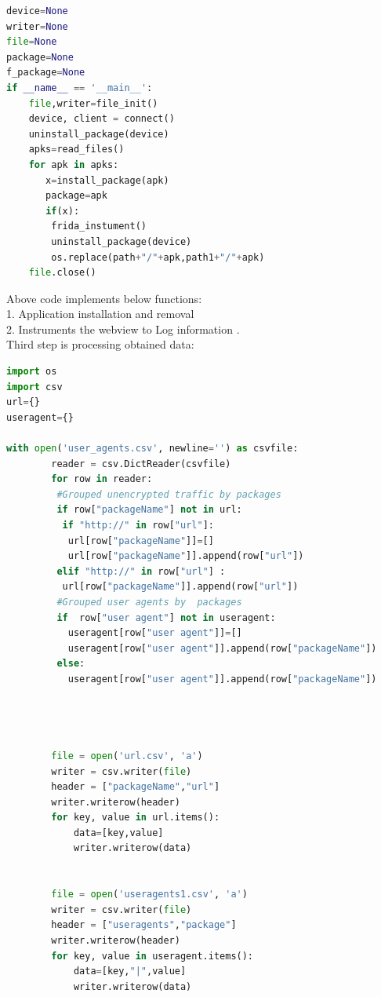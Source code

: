 \begin{lstlisting}[language=Python, caption=Installation]
device=None
writer=None
file=None
package=None
f_package=None
if __name__ == '__main__':
    file,writer=file_init() 
    device, client = connect()     
    uninstall_package(device)
    apks=read_files() 
    for apk in apks:
       x=install_package(apk)
       package=apk
       if(x):
        frida_instument()
        uninstall_package(device)
        os.replace(path+"/"+apk,path1+"/"+apk)       
    file.close()
    \end{lstlisting}   




Above code implements below functions:\\
1. Application installation and removal \\
2. Instruments the webview to Log information .\\

Third step is processing obtained data:
\begin{lstlisting}[language=Python, caption=Proccessing the obtained data] 
import os
import csv
url={}
useragent={}

with open('user_agents.csv', newline='') as csvfile:
        reader = csv.DictReader(csvfile)
        for row in reader:
         #Grouped unencrypted traffic by packages       
         if row["packageName"] not in url:
          if "http://" in row["url"]:
           url[row["packageName"]]=[]
           url[row["packageName"]].append(row["url"])
         elif "http://" in row["url"] :
          url[row["packageName"]].append(row["url"])
         #Grouped user agents by  packages  
         if  row["user agent"] not in useragent:
           useragent[row["user agent"]]=[]
           useragent[row["user agent"]].append(row["packageName"])
         else:
           useragent[row["user agent"]].append(row["packageName"])       
      
  
       
       
        file = open('url.csv', 'a')
        writer = csv.writer(file)  
        header = ["packageName","url"] 
        writer.writerow(header)        
        for key, value in url.items():
            data=[key,value]
            writer.writerow(data)
                
                
        file = open('useragents1.csv', 'a')
        writer = csv.writer(file)  
        header = ["useragents","package"]
        writer.writerow(header)   
        for key, value in useragent.items():
            data=[key,"|",value]
            writer.writerow(data)       

   \end{lstlisting}  
       

